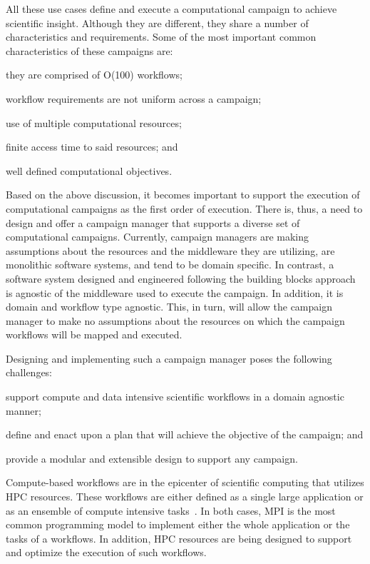 All these use cases define and execute a computational campaign to achieve scientific insight.
Although they are different, they share a number of characteristics and requirements.
Some of the most important common characteristics of these campaigns are:
\begin{inparaenum}[(1)]
    \item they are comprised of O(100) workflows;
    \item workflow requirements are not uniform across a campaign;
    \item use of multiple computational resources;
    \item finite access time to said resources; and
    \item well defined computational objectives.
\end{inparaenum}

Based on the above discussion, it becomes important to support the execution of computational campaigns as the first order of execution.
There is, thus, a need to design and offer a campaign manager that supports a diverse set of computational campaigns.
Currently, campaign managers are making assumptions about the resources and the middleware they are utilizing, are monolithic software systems, and tend to be domain specific.
In contrast, a software system designed and engineered following the building blocks approach~\cite{turilli2019middleware} is agnostic of the middleware used to execute the campaign.
In addition, it is domain and workflow type agnostic.
This, in turn, will allow the campaign manager to make no assumptions about the resources on which the campaign workflows will be mapped and executed.

Designing and implementing such a campaign manager poses the following challenges:
\begin{inparaenum}[1)]
    \item support compute and data intensive scientific workflows in a domain agnostic manner;
    \item define and enact upon a plan that will achieve the objective of the campaign; and
    \item provide a modular and extensible design to support any campaign.
\end{inparaenum}

Compute-based workflows are in the epicenter of scientific computing that utilizes HPC resources.
These workflows are either defined as a single large application or as an ensemble of compute intensive tasks~\cite{balasubramanian2018harnessing}.
In both cases, MPI is the most common programming model to implement either the whole application or the tasks of a workflows.
In addition, HPC resources are being designed to support and optimize the execution of such workflows.

